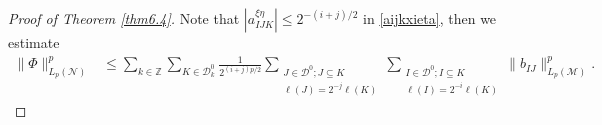 \documentclass[oneside,english,a4wide]{amsart}
\numberwithin{equation}{section}
\numberwithin{figure}{section}
\theoremstyle{plain}
\theoremstyle{plain}
\theoremstyle{definition}
\theoremstyle{plain}
\theoremstyle{remark}
\theoremstyle{definition}
\theoremstyle{remark}
\theoremstyle{definition}
\newcommand{\8}{\infty}
\begin{document}
\begin{proof}[Proof of Theorem \ref{thm6.4}]
Note that
$|a_{IJK}^{\xi\eta}|\le 2^{-(i+j)/2}$ in \eqref{aijkxieta}, then we estimate 
\begin{equation*}\label{zeta}
	\begin{aligned}
		\|\varPhi\|_{L_p(\mathcal{N})}^p
		{}&\le \sum_{k\in\mathbb{Z}}\sum_{K\in\mathcal{D}^0_k}\frac{1}{2^{(i+j)p/2}}\sum_{\substack{J\in\mathcal{D}^0;J\subseteq K\\ \ell(J)=2^{-j}\ell(K)}}\sum_{\substack{I\in\mathcal{D}^0;I\subseteq K\\ \ell(I)=2^{-i}\ell(K)}}\|b_{IJ}\|_{L_p(\mathcal{M})}^p.

\end{aligned}
\end{equation*}
\end{proof}
\end{document}
